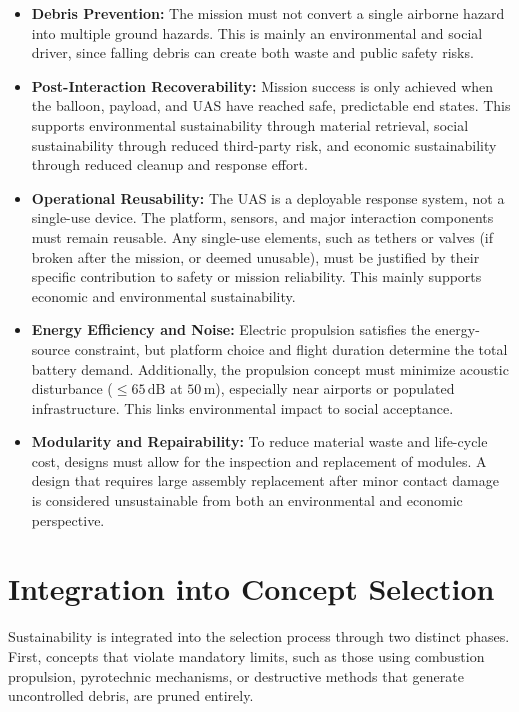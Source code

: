 \begin{itemize}
    \item \textbf{Debris Prevention:} The mission must not convert a single airborne hazard into multiple ground hazards. This is mainly an environmental and social driver, since falling debris can create both waste and public safety risks.  

    \item \textbf{Post-Interaction Recoverability:} Mission success is only achieved when the balloon, payload, and UAS have reached safe, predictable end states. This supports environmental sustainability through material retrieval, social sustainability through reduced third-party risk, and economic sustainability through reduced cleanup and response effort.

    \item \textbf{Operational Reusability:} The UAS is a deployable response system, not a single-use device. The platform, sensors, and major interaction components must remain reusable. Any single-use elements, such as tethers or valves (if broken after the mission, or deemed unusable), must be justified by their specific contribution to safety or mission reliability. This mainly supports economic and environmental sustainability.

    \item \textbf{Energy Efficiency and Noise:} Electric propulsion satisfies the energy-source constraint, but platform choice and flight duration determine the total battery demand. Additionally, the propulsion concept must minimize acoustic disturbance ($\le 65\,\mathrm{dB}$ at $50\,\mathrm{m}$), especially near airports or populated infrastructure. This links environmental impact to social acceptance.

    \item \textbf{Modularity and Repairability:} To reduce material waste and life-cycle cost, designs must allow for the inspection and replacement of modules. A design that requires large assembly replacement after minor contact damage is considered unsustainable from both an environmental and economic perspective.
\end{itemize}

\vspace{-20pt}
\section{Integration into Concept Selection} \label{sec:sus-integration-into-concept-selection}
Sustainability is integrated into the selection process through two distinct phases. First, concepts that violate mandatory limits, such as those using combustion propulsion, pyrotechnic mechanisms, or destructive methods that generate uncontrolled debris, are pruned entirely. 

